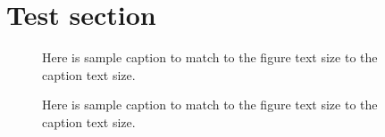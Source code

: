 \documentclass[aps,prb,twocolumn,superscriptaddress,amsmath]{revtex4-2}
\begin{document}
%
\section{Test section}


\begin{figure}[h]
    \centering
    
    \caption{Here is sample caption to match to the figure text size to the caption text size.}
\end{figure}


\newpage

\begin{figure}[h]
    \centering
    
    \caption{Here is sample caption to match to the figure text size to the caption text size.}
\end{figure}
\end{document}
